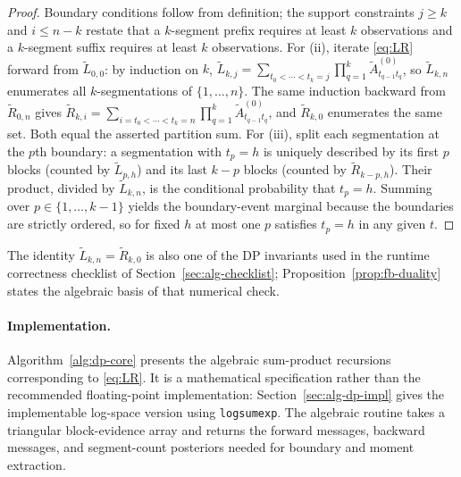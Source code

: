 \begin{proof}
Boundary conditions follow from definition; the support constraints $j\ge k$ and $i\le n-k$
restate that a $k$-segment prefix requires at least $k$ observations and a $k$-segment suffix requires at least $k$ observations.
For (ii), iterate \eqref{eq:LR} forward from $\widetilde L_{0,0}$: by induction on $k$,
$\widetilde L_{k,j}=\sum_{t_0<\cdots<t_k=j}\prod_{q=1}^k\widetilde A^{(0)}_{t_{q-1}t_q}$,
so $\widetilde L_{k,n}$ enumerates all $k$-segmentations of $\{1,\dots,n\}$. The same induction
backward from $\widetilde R_{0,n}$ gives $\widetilde R_{k,i}=\sum_{i=t_0<\cdots<t_k=n}\prod_{q=1}^k\widetilde A^{(0)}_{t_{q-1}t_q}$,
and $\widetilde R_{k,0}$ enumerates the same set. Both equal the asserted partition sum.
For (iii), split each segmentation at the $p$th boundary: a segmentation with $t_p=h$ is uniquely
described by its first $p$ blocks (counted by $\widetilde L_{p,h}$) and its last $k-p$ blocks
(counted by $\widetilde R_{k-p,h}$). Their product, divided by $\widetilde L_{k,n}$, is the
conditional probability that $t_p=h$. Summing over $p\in\{1,\dots,k-1\}$ yields the boundary-event
marginal because the boundaries are strictly ordered, so for fixed $h$ at most one $p$ satisfies
$t_p=h$ in any given $t$.
\end{proof}

The identity $\widetilde L_{k,n}=\widetilde R_{k,0}$ is also one of the DP invariants used in the
runtime correctness checklist of Section~\ref{sec:alg-checklist}; Proposition~\ref{prop:fb-duality}
states the algebraic basis of that numerical check.

\paragraph{Implementation.}
Algorithm~\ref{alg:dp-core} presents the algebraic sum-product recursions corresponding to
\eqref{eq:LR}. It is a mathematical specification rather than the recommended floating-point
implementation: Section~\ref{sec:alg-dp-impl} gives the implementable log-space version using
\texttt{logsumexp}. The algebraic routine takes a triangular block-evidence array and returns the
forward messages, backward messages, and segment-count posteriors needed for boundary and moment
extraction.


